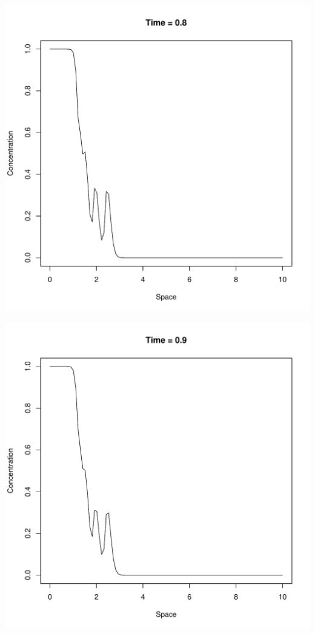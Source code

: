 \documentclass{tufte-handout}\usepackage[]{graphicx}\usepackage[]{xcolor}
\makeatletter
\def\maxwidth{ %
  \ifdim\Gin@nat@width>\linewidth
    \linewidth
  \else
    \Gin@nat@width
  \fi
}
\newenvironment{knitrout}{}{} %
\makeatother
\begin{document}
\begin{knitrout}
\includegraphics[width=\maxwidth]{figure/unnamed-chunk-2-9} 

\includegraphics[width=\maxwidth]{figure/unnamed-chunk-2-10} 


\end{knitrout}
\end{document}
